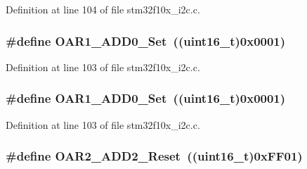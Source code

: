 Definition at line 104 of file stm32f10x\+\_\+i2c.\+c.

\subsubsection[{\texorpdfstring{O\+A\+R1\+\_\+\+A\+D\+D0\+\_\+\+Set}{OAR1_ADD0_Set}}]{\setlength{\rightskip}{0pt plus 5cm}\#define O\+A\+R1\+\_\+\+A\+D\+D0\+\_\+\+Set~(({\bf uint16\+\_\+t})0x0001)}\hypertarget{group___i2_c___private___defines_gaeb56bf422fd13e68c82783df63f425ab}{}\label{group___i2_c___private___defines_gaeb56bf422fd13e68c82783df63f425ab}


Definition at line 103 of file stm32f10x\+\_\+i2c.\+c.

\subsubsection[{\texorpdfstring{O\+A\+R1\+\_\+\+A\+D\+D0\+\_\+\+Set}{OAR1_ADD0_Set}}]{\setlength{\rightskip}{0pt plus 5cm}\#define O\+A\+R1\+\_\+\+A\+D\+D0\+\_\+\+Set~(({\bf uint16\+\_\+t})0x0001)}\hypertarget{group___i2_c___private___defines_gaeb56bf422fd13e68c82783df63f425ab}{}\label{group___i2_c___private___defines_gaeb56bf422fd13e68c82783df63f425ab}


Definition at line 103 of file stm32f10x\+\_\+i2c.\+c.

\subsubsection[{\texorpdfstring{O\+A\+R2\+\_\+\+A\+D\+D2\+\_\+\+Reset}{OAR2_ADD2_Reset}}]{\setlength{\rightskip}{0pt plus 5cm}\#define O\+A\+R2\+\_\+\+A\+D\+D2\+\_\+\+Reset~(({\bf uint16\+\_\+t})0x\+F\+F01)}\hypertarget{group___i2_c___private___defines_ga243036db699954e290f48e6743323054}{}\label{group___i2_c___private___defines_ga243036db699954e290f48e6743323054}


